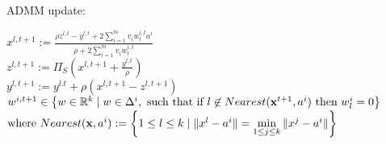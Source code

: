 \documentclass[11pt]{article}
\numberwithin{equation}{section}
\begin{document}
\noindent ADMM update:
\begin{center}
	$x^{l,t+1} := \frac{\rho z^{l,t} - y^{l,t} + 2\sum\limits_{i=1}^m {v_i w^{i,t}_l a^i} }{\rho + 2\sum\limits_{i=1}^m v_i w^{i,t}_l}$ \\ \bigskip
	$z^{l,t+1} := \Pi_S(x^{l,t+1} + \frac{y^{l,t}}{\rho} )$ \\ \bigskip
	$y^{l,t+1} := y^{l.t} + \rho (x^{l,t+1} - z^{l,t+1})$ \\ \bigskip
	$w^{i,t+1} \in \left\lbrace w \in \mathbb{R}^k \mid w \in \Delta^i,\text{ such that if }l \not\in Nearest({\bf x}^{t+1} ,a^i) \text{ then } w^i_l=0 \right\rbrace $
\smallskip
	$\text{where } Nearest({\bf x} ,a^i) := \left\lbrace 1 \leq l \leq k \mid \|x^l -a^i\|= \min\limits_{1 \leq j \leq k} \|x^j - a^i\| \right\rbrace$
\end{center}

\newpage



\end{document}
